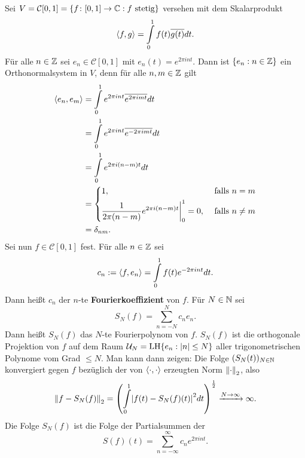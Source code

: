 \begin{anwendung}
	\label{anw:4.17}
	Sei $V = \mathcal{C}[0,1] = \{f \colon [0,1] \rightarrow \mathbb{C} : f \text{ stetig}\}$ versehen mit dem Skalarprodukt
	\[
		\left\langle f,g\right\rangle = \int\limits_{0}^{1} f(t) \overline{g(t)}dt.
	\]
	Für alle $n \in \mathbb{Z}$ sei $e_n \in \mathcal{C}[0,1]$ mit $e_n(t) = e^{2\pi i n t}$.
	Dann ist $\{e_n : n \in \mathbb{Z}\}$ ein Orthonormalsystem in $V$, denn für alle $n,m \in \mathbb{Z}$ gilt
	\begin{align*}
		\left\langle e_n,e_m\right\rangle &= \int\limits_{0}^{1} e^{2 \pi i n t} \overline{e^{2\pi i m t}} dt \\
				&= \int\limits_{0}^{1} e^{2 \pi i n t} \overline{e^{-2\pi i m t}} dt \\
				&= \int\limits_{0}^{1} e^{2\pi i (n-m)t} dt \\
				&= \begin{dcases}
					1, & \text{ falls } n=m \\
					\frac{1}{2 \pi (n-m)} e^{2\pi i (n-m) t} \bigg|_0^1 = 0, & \text{ falls } n \neq m \\ 
				\end{dcases} \\
				&= \delta_{nm}.
	\end{align*}
	Sei nun $f \in \mathcal{C}[0,1]$ fest.
	Für alle $n \in \mathbb{Z}$ sei
	\[
		c_n := \left\langle f,e_n\right\rangle = \int\limits_{0}^{1} f(t) e^{-2\pi i n t} dt.
	\]
	Dann heißt $c_n$ der $n$-te \textbf{Fourierkoeffizient} von $f$.
	Für $N \in \mathbb{N}$ sei
	\[
		S_N(f) = \sum\limits_{n=-N}^{N} c_n e_n.
	\]
	Dann heißt $S_N(f)$ das $N$-te Fourierpolynom von $f$.
	$S_N(f)$ ist die orthogonale Projektion von $f$ auf dem Raum $\mathcal{U}_N = \operatorname{LH}\{e_n : \left\lvert n\right\rvert \leq N\}$ aller trigonometrischen Polynome vom Grad $\leq N$.
	Man kann dann zeigen:
	Die Folge $(S_N(t))_{N \in \mathbb{N}}$ konvergiert gegen $f$ bezüglich der von $\left\langle\cdot,\cdot\right\rangle$ erzeugten Norm $\left\lVert\cdot\right\rVert_2$, also
	\[
		\no{f-S_N(f)}_2 = \enb{\int\limits_{0}^{1} \abs{f(t)-S_N(f)(t)}^2 dt}^{\frac{1}{2}} \xrightarrow{N\rightarrow \infty} \infty.
	\]
	Die Folge $S_N(f)$ ist die Folge der Partialsummen der 
	\[
		S(f)(t) = \sum\limits_{n=-\infty}^{\infty} c_n e^{2\pi i n t}.
	\]
	

\end{anwendung}
